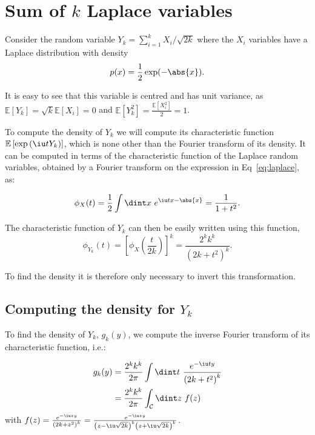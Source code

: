 
\section{Sum of $k$ Laplace variables} %
\label{app:laplace}

Consider the random variable $Y_k = \sum_{i=1}^k X_i/\sqrt{2k}$ where the $X_i$ variables have a Laplace distribution with density
\begin{equation}\label{eq:laplace}
p(x) = \frac{1}{2}\exp(-\abs{x}).
\end{equation}

It is easy to see that this variable is centred and has unit variance, as $\mathbb{E}\left[Y_k\right]=\sqrt{k}\mathbb{E}\left[X_i\right]=0$ and $\mathbb{E}\left[Y_k^2\right]= \frac{\mathbb{E}\left[X_i^2\right]}{2}=1$.

To compute the density of $Y_k$ we will compute its characteristic function $\mathbb{E}\left[\exp\left(\iu t Y_k\right)\right]$, which is none other than the Fourier transform of its density. It can be computed in terms of the characteristic function of the Laplace random variables, obtained by a Fourier transform on the expression in Eq~\eqref{eq:laplace}, as:

\begin{equation}\label{eq:characteristic_function}
\phi_X(t)= \frac{1}{2} \int \dint x~ e^{\iu tx - \abs{x}}= \frac{1}{1+t^2}.
\end{equation}

The characteristic function of $Y_k$ can then be easily written using this function, 
\begin{equation}\label{eq:characteristic_Y}
\phi_{Y_k}(t) = \left[\phi_X\left(\frac{t}{2k}\right)\right]^k = \frac{2^k k^k}{\left(2k+t^2\right)^k}.
\end{equation}

To find the density it is therefore only necessary to invert this transformation.

\subsection{Computing the density for $Y_k$} %
\label{sub:computing_the_density_for_}

To find the density of $Y_k$, $g_k(y)$, we compute the inverse Fourier transform of its characteristic function, i.e.:

\begin{equation}\label{eq:fourier_inv}
\begin{split}
g_k(y) &=\frac{2^kk^k}{2 \pi} \int \dint t~ \frac{e^{-\iu t y}}{\left(2k+t^2\right)^k}\\
&=\frac{2^kk^k}{2\pi} \int_{\mathcal{C}} \dint z~ f(z)
\end{split}
\end{equation}
with $f(z)=\frac{e^{-\iu z y}}{\left(2k+z^2\right)^k}=\frac{e^{-\iu z y}}{\left(z-\iu\sqrt{2k}\right)^k \left(z+\iu\sqrt{2k}\right)^k}$.

